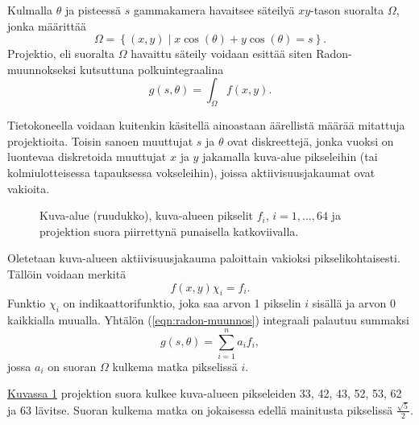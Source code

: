 Kulmalla $\theta$ ja pisteessä $s$ gammakamera havaitsee säteilyä $xy$-tason suoralta $\Omega$, jonka määrittää
\begin{equation*}
    \Omega=\left\{ (x, y) \mid x\cos(\theta)+y\cos(\theta)=s \right\}.
\end{equation*}
Projektio, eli suoralta $\Omega$ havaittu säteily voidaan esittää siten Radon-muunnokseksi kutsuttuna polkuintegraalina\cite{radon_determination_1986, bruyant_analytic_2002}
\begin{equation}\label{eqn:radon-muunnos}
    g(s, \theta)=\int_{\Omega}f(x, y).
\end{equation}

Tietokoneella voidaan kuitenkin käsitellä ainoastaan äärellistä määrää mitattuja projektioita. Toisin sanoen muuttujat $s$ ja $\theta$ ovat diskreettejä, jonka vuoksi on luontevaa diskretoida muuttujat $x$ ja $y$ jakamalla kuva-alue pikseleihin (tai kolmiulotteisessa tapauksessa vokseleihin), joissa aktiivisuusjakaumat ovat vakioita.

\begin{figure}[H]
    \centering
    \captionsetup{width=.9\textwidth}
    
    \caption{Kuva-alue (ruudukko), kuva-alueen pikselit $f_i$, $i=1,\ldots,64$ ja projektion suora piirrettynä punaisella katkoviivalla.}
    \label{fig:diskreetti-projektio}
\end{figure}

%

Oletetaan kuva-alueen aktiivisuusjakauma paloittain vakioksi pikselikohtaisesti. Tällöin voidaan merkitä
\begin{equation*}
    f(x, y)\chi_{i}=f_i.
\end{equation*}
Funktio $\chi_i$ on indikaattorifunktio, joka saa arvon 1 pikselin $i$ sisällä ja arvon 0 kaikkialla muualla. Yhtälön (\ref{eqn:radon-muunnos}) integraali palautuu summaksi
\begin{equation}\label{eqn:diskreetti-radon-muunnos}
    g(s, \theta)=\sum_{i=1}^{n}a_{i}f_{i},
\end{equation}
jossa $a_i$ on suoran $\Omega$ kulkema matka pikselissä $i$. 

\hyperref[fig:diskreetti-projektio]{Kuvassa \ref*{fig:diskreetti-projektio}} projektion suora kulkee kuva-alueen pikseleiden 33, 42, 43, 52, 53, 62 ja 63 lävitse. Suoran kulkema matka on jokaisessa edellä mainitusta pikselissä $\frac{\sqrt{5}}{2}$.

